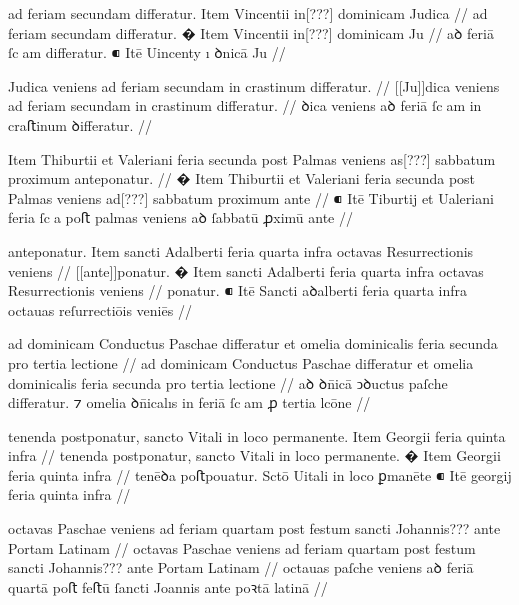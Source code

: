 \ex \bg
\gla
{}
ad feriam
secundam differatur.
{} Item Vincentii in[???] dominicam Judica
//
\glRekonstrukcja
{}
ad feriam
secundam differatur.
� Item Vincentii in[???] dominicam Ju
//
\glU
{}
aꝺ feriā ſcam differatur. ⁌ Itē Uincenty ı ꝺnicā Ju
//
\endgl
\eg


\ex \bg
\gla
{}
Judica veniens ad feriam secundam
in crastinum differatur.
//
\glRekonstrukcja
{}
[[Ju]]dica veniens ad feriam secundam
in crastinum differatur.
//
\glU
{}
ꝺica veniens aꝺ feriā ſcam in craﬅinum ꝺiﬀeratur.
//
\endgl
\eg



\ex \bg
\gla
{}
{} Item Thiburtii et Valeriani feria secunda post Palmas veniens as[???]
sabbatum proximum anteponatur.
//
\glRekonstrukcja
{}
� Item Thiburtii et Valeriani feria secunda post Palmas veniens ad[???]
sabbatum proximum ante
//
\glU
{}
⁌ Itē Tiburtij et Ualeriani feria ſca poﬅ palmas veniens aꝺ ſabbatū ꝓximū ante
//
\endgl
\eg



\ex \bg
\gla
{}
anteponatur.
{} Item sancti Adalberti feria quarta infra octavas Resurrectionis
veniens
//
\glRekonstrukcja
{}
[[ante]]ponatur.
� Item sancti Adalberti feria quarta infra octavas Resurrectionis
veniens
//
\glU
{}
ponatur. ⁌ Itē Sancti aꝺalberti feria quarta infra octauas reſurrectiōis veniēs
//
\endgl
\eg



\ex \bg
\gla
{}
ad dominicam Conductus Paschae differatur et omelia dominicalis {} feria secunda pro tertia lectione
//
\glRekonstrukcja
{}
ad dominicam Conductus Paschae differatur et omelia dominicalis {}feria secunda pro tertia lectione
//
\glU
{}
aꝺ ꝺn̄icā ↄꝺuctus paſche diﬀeratur. ⁊ omelia ꝺn̄icalıs in feriā ſcam ꝓ tertia lcōne
//
\endgl
\eg



\ex \bg
\gla
{}
tenenda postponatur, sancto Vitali
in loco permanente.
{} Item Georgii feria quinta infra
//
\glRekonstrukcja
{}
tenenda postponatur, sancto Vitali
in loco permanente.
� Item Georgii feria quinta infra
//
\glU
{}
tenēꝺa poﬅpouatur. Sctō Uitali in loco ꝑmanēte ⁌ Itē georgij feria quinta infra
//
\endgl
\eg




\ex \bg
\gla
{}
octavas Paschae veniens ad feriam
quartam post festum sancti Johannis{???} ante Portam Latinam 
//
\glRekonstrukcja
{}
octavas Paschae veniens ad feriam
quartam post festum sancti Johannis{???} ante Portam Latinam 
//
\glU
{}
octauas paſche veniens aꝺ feriā quartā poﬅ feﬅū ſancti Joannis ante poꝛtā latinā 
//
\endgl
\eg





